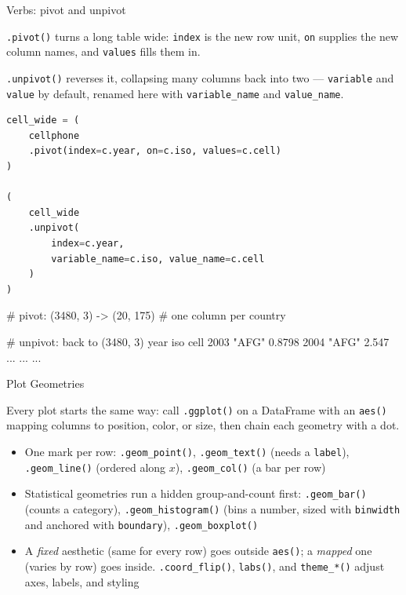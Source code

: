 \documentclass[8pt,aspectratio=169]{beamer}
\begin{document}
\begin{frame}[fragile]{Verbs: pivot and unpivot}
\begin{splitcode}{%

\texttt{.pivot()} turns a long table wide: \texttt{index} is the new row unit, \texttt{on} supplies the new column names, and \texttt{values} fills them in.

\texttt{.unpivot()} reverses it, collapsing many columns back into two --- \texttt{variable} and \texttt{value} by default, renamed here with \texttt{variable\_name} and \texttt{value\_name}.

}
\begin{lstlisting}[language=Python]
cell_wide = (
    cellphone
    .pivot(index=c.year, on=c.iso, values=c.cell)
)

(
    cell_wide
    .unpivot(
        index=c.year,
        variable_name=c.iso, value_name=c.cell
    )
)
\end{lstlisting}
\begin{codeoutput}
# pivot: (3480, 3) -> (20, 175)
# one column per country

# unpivot: back to (3480, 3)
year  iso    cell
2003  "AFG"  0.8798
2004  "AFG"  2.547
...   ...    ...
\end{codeoutput}
\end{splitcode}
\end{frame}

\begin{textframe}{Plot Geometries}

Every plot starts the same way: call \texttt{.ggplot()} on a DataFrame with an \texttt{aes()} mapping columns to position, color, or size, then chain each geometry with a dot.

\begin{itemize}
\item One mark per row: \texttt{.geom\_point()}, \texttt{.geom\_text()} (needs a \texttt{label}), \texttt{.geom\_line()} (ordered along $x$), \texttt{.geom\_col()} (a bar per row)
\item Statistical geometries run a hidden group-and-count first: \texttt{.geom\_bar()} (counts a category), \texttt{.geom\_histogram()} (bins a number, sized with \texttt{binwidth} and anchored with \texttt{boundary}), \texttt{.geom\_boxplot()}
\item A \textit{fixed} aesthetic (same for every row) goes outside \texttt{aes()}; a \textit{mapped} one (varies by row) goes inside. \texttt{.coord\_flip()}, \texttt{labs()}, and \texttt{theme\_*()} adjust axes, labels, and styling
\end{itemize}

\end{textframe}
\end{document}
